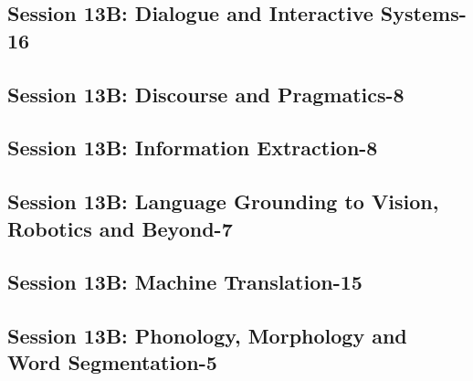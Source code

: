 \subsection{\large Session 13B: Dialogue and Interactive Systems-16}
\label{parallel-session-13B-trackA}
\TrackALoc\hfill\sessionchair{}{}
\clearpage
\subsection{\large Session 13B: Discourse and Pragmatics-8}
\label{parallel-session-13B-trackB}
\TrackBLoc\hfill\sessionchair{}{}
\clearpage
\subsection{\large Session 13B: Information Extraction-8}
\label{parallel-session-13B-trackC}
\TrackCLoc\hfill\sessionchair{}{}
\clearpage
\subsection{\large Session 13B: Language Grounding to Vision, Robotics and Beyond-7}
\label{parallel-session-13B-trackD}
\TrackDLoc\hfill\sessionchair{}{}
\clearpage
\subsection{\large Session 13B: Machine Translation-15}
\label{parallel-session-13B-trackE}
\TrackELoc\hfill\sessionchair{}{}
\clearpage
\subsection{\large Session 13B: Phonology, Morphology and Word Segmentation-5}
\label{parallel-session-13B-trackF}
\TrackFLoc\hfill\sessionchair{}{}
\clearpage
